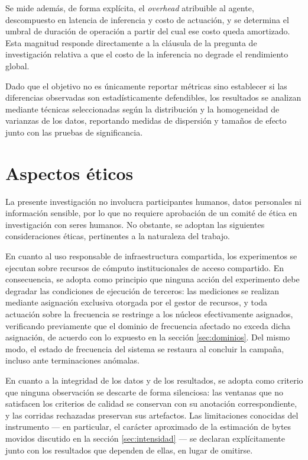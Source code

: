 \documentclass[12pt,oneside,spanish]{book}
\begin{document}
Se mide además, de forma explícita, el \textit{overhead} atribuible al agente, descompuesto en latencia de inferencia y costo de actuación, y se determina el umbral de duración de operación a partir del cual ese costo queda amortizado. Esta magnitud responde directamente a la cláusula de la pregunta de investigación relativa a que el costo de la inferencia no degrade el rendimiento global.

Dado que el objetivo no es únicamente reportar métricas sino establecer si las diferencias observadas son estadísticamente defendibles, los resultados se analizan mediante técnicas seleccionadas según la distribución y la homogeneidad de varianzas de los datos, reportando medidas de dispersión y tamaños de efecto junto con las pruebas de significancia.

\section{Aspectos éticos}

La presente investigación no involucra participantes humanos, datos personales ni información sensible, por lo que no requiere aprobación de un comité de ética en investigación con seres humanos. No obstante, se adoptan las siguientes consideraciones éticas, pertinentes a la naturaleza del trabajo.

En cuanto al uso responsable de infraestructura compartida, los experimentos se ejecutan sobre recursos de cómputo institucionales de acceso compartido. En consecuencia, se adopta como principio que ninguna acción del experimento debe degradar las condiciones de ejecución de terceros: las mediciones se realizan mediante asignación exclusiva otorgada por el gestor de recursos, y toda actuación sobre la frecuencia se restringe a los núcleos efectivamente asignados, verificando previamente que el dominio de frecuencia afectado no exceda dicha asignación, de acuerdo con lo expuesto en la sección \ref{sec:dominios}. Del mismo modo, el estado de frecuencia del sistema se restaura al concluir la campaña, incluso ante terminaciones anómalas.

En cuanto a la integridad de los datos y de los resultados, se adopta como criterio que ninguna observación se descarte de forma silenciosa: las ventanas que no satisfacen los criterios de calidad se conservan con su anotación correspondiente, y las corridas rechazadas preservan sus artefactos. Las limitaciones conocidas del instrumento --- en particular, el carácter aproximado de la estimación de bytes movidos discutido en la sección \ref{sec:intensidad} --- se declaran explícitamente junto con los resultados que dependen de ellas, en lugar de omitirse.
\end{document}
